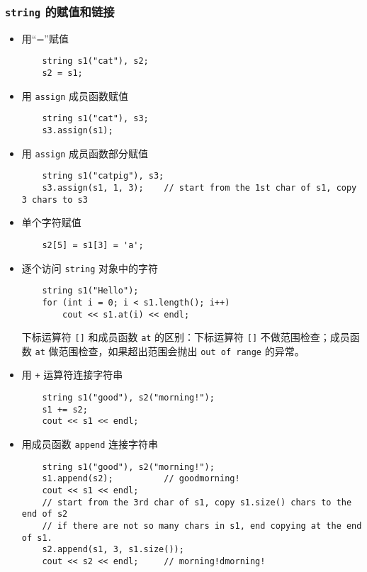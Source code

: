 \documentclass[UTF8]{ctexart}
\begin{document}
\subsubsection{\texttt{string} 的赋值和链接}
\begin{itemize}
    \item 用“=”赋值
    \begin{verbatim}
    string s1("cat"), s2;
    s2 = s1;
    \end{verbatim}
    \item 用 \texttt{assign} 成员函数赋值
    \begin{verbatim}
    string s1("cat"), s3;
    s3.assign(s1);
    \end{verbatim}
    \item 用 \texttt{assign} 成员函数部分赋值
    \begin{verbatim}
    string s1("catpig"), s3;
    s3.assign(s1, 1, 3);    // start from the 1st char of s1, copy 3 chars to s3
    \end{verbatim}
    \item 单个字符赋值
    \begin{verbatim}
    s2[5] = s1[3] = 'a';
    \end{verbatim}
    \item 逐个访问 \texttt{string} 对象中的字符
    \begin{verbatim}
    string s1("Hello");
    for (int i = 0; i < s1.length(); i++)
        cout << s1.at(i) << endl;
    \end{verbatim}
    下标运算符 \texttt{[]} 和成员函数 \texttt{at} 的区别：下标运算符 \texttt{[]} 不做范围检查；成员函数
    \texttt{at} 做范围检查，如果超出范围会抛出 \texttt{out of range} 的异常。
    \item 用 \texttt{+} 运算符连接字符串
    \begin{verbatim}
    string s1("good"), s2("morning!");
    s1 += s2;
    cout << s1 << endl;
    \end{verbatim}
    \item 用成员函数 \texttt{append} 连接字符串
    \begin{verbatim}
    string s1("good"), s2("morning!");
    s1.append(s2);          // goodmorning!
    cout << s1 << endl;
    // start from the 3rd char of s1, copy s1.size() chars to the end of s2
    // if there are not so many chars in s1, end copying at the end of s1.
    s2.append(s1, 3, s1.size());
    cout << s2 << endl;     // morning!dmorning!
    \end{verbatim}
\end{itemize}
\end{document}
